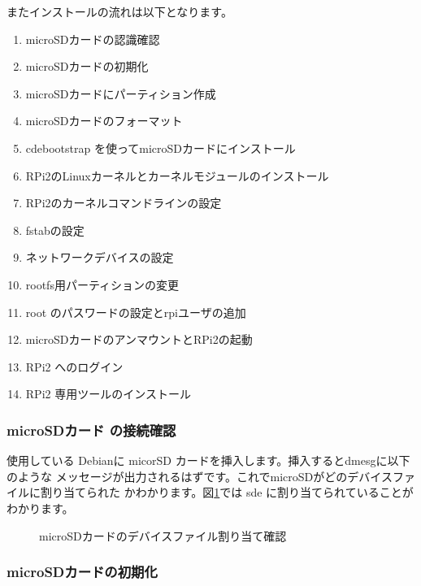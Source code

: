 \documentclass[mingoth,a4paper]{jsarticle}
\begin{document}
またインストールの流れは以下となります。
\begin{enumerate}
\item microSDカードの認識確認
\item microSDカードの初期化
\item microSDカードにパーティション作成
\item microSDカードのフォーマット
\item cdebootstrap を使ってmicroSDカードにインストール
\item RPi2のLinuxカーネルとカーネルモジュールのインストール
\item RPi2のカーネルコマンドラインの設定
\item fstabの設定
\item ネットワークデバイスの設定
\item rootfs用パーティションの変更
\item root のパスワードの設定とrpiユーザの追加
\item microSDカードのアンマウントとRPi2の起動
\item RPi2 へのログイン
\item RPi2 専用ツールのインストール
\end{enumerate}

\subsubsection{microSDカード の接続確認}

使用している Debianに micorSD カードを挿入します。挿入するとdmesgに以下のような
メッセージが出力されるはずです。これでmicroSDがどのデバイスファイルに割り当てられた
かわかります。図\ref{fig:microsd}では sde に割り当てられていることがわかります。

\begin{figure}[htbp]

\caption{microSDカードのデバイスファイル割り当て確認}
\label{fig:microsd}
\end{figure}

\subsubsection{microSDカードの初期化}
\end{document}
